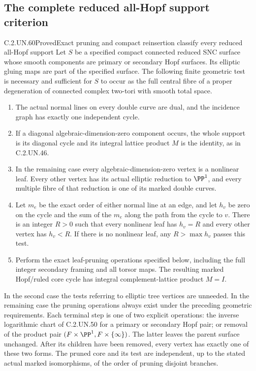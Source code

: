 \subsection{The complete reduced all-Hopf support criterion}

\begin{statement}{C.2.UN.60}{Proved}{Exact pruning and compact reinsertion classify every reduced all-Hopf support}
Let $S$ be a specified compact connected reduced SNC surface whose
smooth components are primary or secondary Hopf surfaces. Its
elliptic gluing maps are part of the specified surface. The following
finite geometric test is necessary and sufficient for $S$ to occur
as the full central fibre of a proper degeneration of connected
complex two-tori with smooth total space.

\begin{enumerate}
\item The actual normal lines on every double curve are dual, and
the incidence graph has exactly one independent cycle.
\item If a diagonal algebraic-dimension-zero component occurs, the
whole support is its diagonal cycle and its integral lattice product
$M$ is the identity, as in C.2.UN.46.
\item In the remaining case every algebraic-dimension-zero vertex
is a nonlinear leaf. Every other vertex has its actual elliptic
reduction to $\PP^1$, and every multiple fibre of that reduction
is one of its marked double curves.
\item Let $m_e$ be the exact order of either normal line at an edge,
and let $h_v$ be zero on the cycle and the sum of the $m_e$ along
the path from the cycle to $v$. There is an integer $R>0$ such that
every nonlinear leaf has $h_v=R$ and every other vertex has $h_v<R$.
If there is no nonlinear leaf, any $R>\max h_v$ passes this test.
\item Perform the exact leaf-pruning operations specified below,
including the full integer secondary framing and all torsor maps.
The resulting marked Hopf/ruled core cycle has integral
complement-lattice product $M=I$.
\end{enumerate}

In the second case the tests referring to elliptic tree vertices are
unneeded. In the remaining case the pruning operations always exist
under the preceding geometric requirements. Each terminal step is
one of two explicit operations: the inverse logarithmic chart of
C.2.UN.50 for a primary or secondary Hopf pair; or removal of the
product pair $(F\times\PP^1,F\times\{\infty\})$. The latter leaves
the parent surface unchanged. After its children have been removed,
every vertex has exactly one of these two forms. The pruned core
and its test are independent, up to the stated actual marked
isomorphisms, of the order of pruning disjoint branches.


\end{statement}

